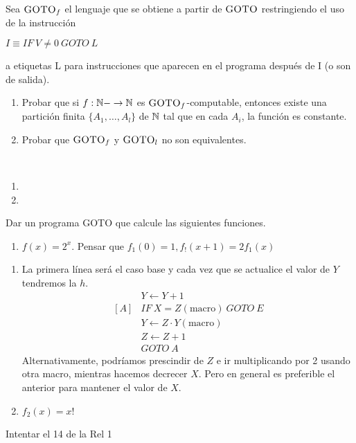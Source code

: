 \documentclass[twoside]{article}
\begin{document}
\begin{ejercicio}{16}
Sea $\textsc{GOTO}_f$ el lenguaje que se obtiene a partir de $\textsc{GOTO}$ restringiendo el uso de la
instrucción

$I\equiv IF\ V\neq 0\ GOTO\ L$

a etiquetas L para instrucciones que aparecen en el programa después de I (o son de salida).

\begin{enumerate}
\item Probar que si $f : \mathbb{N}- \to \mathbb{N}$ es $\textsc{GOTO}_f$-computable, entonces existe una partición finita
$\{A_1,\dots,A_l\}$ de $\mathbb{N}$ tal que en cada $A_i$, la función es constante.
\item Probar que $\textsc{GOTO}_f$ y $\textsc{GOTO}_l$ no son equivalentes.
\end{enumerate}
\end{ejercicio}
\begin{solucion}\
\begin{enumerate}
\item
\item 
\end{enumerate}
\end{solucion}

\begin{ejercicio}{}
Dar un programa GOTO que calcule las siguientes funciones.
\begin{enumerate}
\item $f(x)=2^x$. Pensar que $f_1(0)=1, f_!(x+1)=2f_1(x)$
\end{enumerate}
\end{ejercicio}

\begin{solucion}
\begin{enumerate}

\item La primera línea será el caso base y cada vez que se actualice el valor de $Y$ tendremos la $h$. 
\begin{align*}
&Y\leftarrow Y+1\\
[A]&IF\ X=Z(\text{macro})\ GOTO\ E\\
&Y\leftarrow Z\cdot Y (\text{macro})\\
&Z\leftarrow Z+1\\
&GOTO\ A
\end{align*}
Alternativamente, podríamos prescindir de $Z$ e ir multiplicando por 2 usando otra macro, mientras hacemos decrecer $X$. Pero en general es preferible el anterior para mantener el valor de $X$. 

\item $f_2(x)=x!$
\end{enumerate}
\end{solucion}

Intentar el 14 de la Rel 1
\end{document}
